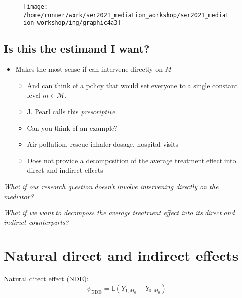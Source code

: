 \documentclass[
  12pt,
]{book}
\providecommand{\tightlist}{%
  \setlength{\itemsep}{0pt}\setlength{\parskip}{0pt}}
\theoremstyle{definition}
\theoremstyle{definition}
\theoremstyle{definition}
\newcommand{\E}{\mathbb{E}}
\newcommand{\1}{\mathbbm{1}}
\begin{document}
\begin{figure}

{\centering \texttt{[image: /home/runner/work/ser2021\_mediation\_workshop/ser2021\_mediation\_workshop/img/graphic4a3]} 

}

\end{figure}

\hypertarget{is-this-the-estimand-i-want}{%
\subsection{Is this the estimand I want?}\label{is-this-the-estimand-i-want}}

\begin{itemize}
\tightlist
\item
  Makes the most sense if can intervene directly on \(M\)

  \begin{itemize}
  \tightlist
  \item
    And can think of a policy that would set everyone to a single constant
    level \(m \in \mathcal{M}\).
  \item
    J. Pearl calls this \emph{prescriptive}.
  \item
    Can you think of an example?
  \item
    Air pollution, rescue inhaler dosage, hospital visits
  \item
    Does not provide a decomposition of the average treatment effect into direct and indirect effects
  \end{itemize}
\end{itemize}

\emph{What if our research question doesn't involve intervening directly on the
mediator?}

\emph{What if we want to decompose the average treatment effect into its direct and
indirect counterparts?}

\hypertarget{natural-direct-and-indirect-effects}{%
\section{Natural direct and indirect effects}\label{natural-direct-and-indirect-effects}}

Natural direct effect (NDE):
\begin{equation*}
  \psi_{\text{NDE}} = \E(Y_{1,M_0} - Y_{0,M_0})
\end{equation*}
\end{document}
